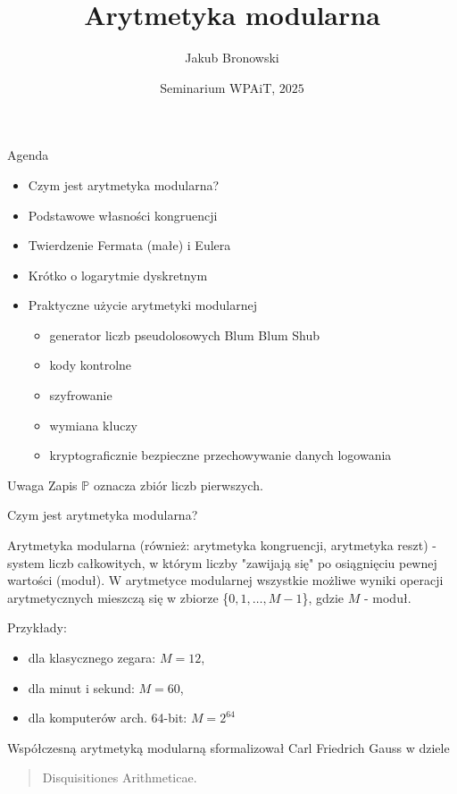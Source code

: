 \documentclass[polish,envcountsect,10pt]{beamer}
\title{Arytmetyka modularna}
\author{Jakub Bronowski}
\date{Seminarium WPAiT, \texorpdfstring{$2025$}{2025}}
\begin{document}
\frame{\titlepage}

\begin{frame}{Agenda}
    \begin{itemize}
        \item Czym jest arytmetyka modularna?
        \item Podstawowe własności kongruencji
        \item Twierdzenie Fermata (małe) i Eulera
        \item Krótko o logarytmie dyskretnym
        \item Praktyczne użycie arytmetyki modularnej
            \begin{itemize}
                \item generator liczb pseudolosowych Blum Blum Shub
                \item kody kontrolne
                \item szyfrowanie
                \item wymiana kluczy
                \item kryptograficznie bezpieczne przechowywanie danych logowania
            \end{itemize}
    \end{itemize}

    \begin{alertblock}{Uwaga}
        Zapis $\mathbb{P}$ oznacza zbiór liczb pierwszych.
    \end{alertblock}

\end{frame}

\begin{frame}{Czym jest arytmetyka modularna?}

    \begin{definition}
        Arytmetyka modularna (również: arytmetyka kongruencji, arytmetyka reszt) - system liczb całkowitych, w którym liczby "zawijają się" po osiągnięciu pewnej wartości (moduł). 
    W arytmetyce modularnej wszystkie możliwe wyniki operacji arytmetycznych mieszczą się w zbiorze  \{${ 0, 1, \ldots, M-1}$\}, gdzie $M$ - moduł.  
    \end{definition}

    Przykłady: 
    \begin{itemize}
        \item dla klasycznego zegara: $M = 12$,
        \item dla minut i sekund: $M = 60$,
        \item dla komputerów arch. 64-bit: $M = {2}^{64}$
    \end{itemize}

    

    Współczesną arytmetyką modularną sformalizował Carl Friedrich Gauss w dziele \begin{quotation}
        Disquisitiones Arithmeticae.
    \end{quotation} 


\end{frame}
\end{document}
